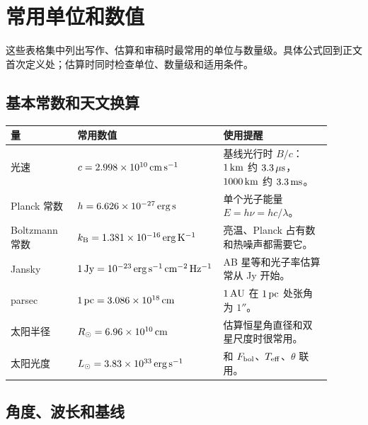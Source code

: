 \chapter{常用单位和数值}
\label{app:b}

这些表格集中列出写作、估算和审稿时最常用的单位与数量级。具体公式回到正文首次定义处；估算时同时检查单位、数量级和适用条件。

\section{基本常数和天文换算}
\label{appsec:b-constants}

\begin{longtable}{p{0.22\linewidth}p{0.30\linewidth}p{0.38\linewidth}}
\toprule
量 & 常用数值 & 使用提醒 \\
\midrule
光速 & \(c=2.998\times10^{10}\,{\rm cm\,s^{-1}}\) & 基线光行时 \(B/c\)：\(1\,{\rm km}\) 约 \(3.3\,\mu{\rm s}\)，\(1000\,{\rm km}\) 约 \(3.3\,{\rm ms}\)。 \\
Planck 常数 & \(h=6.626\times10^{-27}\,{\rm erg\,s}\) & 单个光子能量 \(E=h\nu=hc/\lambda\)。 \\
Boltzmann 常数 & \(k_{\rm B}=1.381\times10^{-16}\,{\rm erg\,K^{-1}}\) & 亮温、Planck 占有数和热噪声都需要它。 \\
Jansky & \(1\,{\rm Jy}=10^{-23}\,{\rm erg\,s^{-1}\,cm^{-2}\,Hz^{-1}}\) & AB 星等和光子率估算常从 Jy 开始。 \\
parsec & \(1\,{\rm pc}=3.086\times10^{18}\,{\rm cm}\) & \(1\,{\rm AU}\) 在 \(1\,{\rm pc}\) 处张角为 \(1''\)。 \\
太阳半径 & \(R_\odot=6.96\times10^{10}\,{\rm cm}\) & 估算恒星角直径和双星尺度时很常用。 \\
太阳光度 & \(L_\odot=3.83\times10^{33}\,{\rm erg\,s^{-1}}\) & 和 \(F_{\rm bol}\)、\(T_{\rm eff}\)、\(\theta\) 联用。 \\
\bottomrule
\end{longtable}

\section{角度、波长和基线}
\label{appsec:b-angle}

